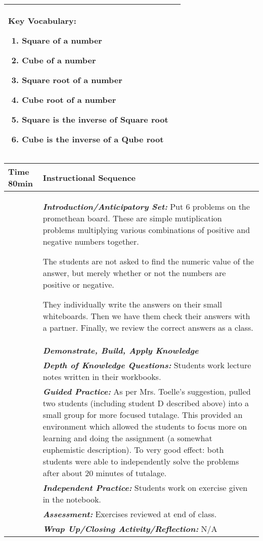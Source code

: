 \begin{tabularx}{\textwidth}{|X|X|}
               \textbf{Key Vocabulary:} 
                      {\begin{enumerate}
                        \item Square of a number
                        \item Cube of a number
                        \item Square root of a number
                        \item Cube root of a number
                        \item Square is the inverse of Square root
                        \item Cube is the inverse of a Qube root
                      \end{enumerate}} \\
                      \hline
\end{tabularx}

\pagebreak

\begin{tabularx}{\textwidth}{|p{0.5in}|X|}
  \hline
  \centerline{\textbf{\large Time} 80min} &  \textbf{\large Instructional Sequence } \\
  \hline
  
  \textbf{} & \textbf{\em Introduction/Anticipatory Set:} Put 6
  problems on the promethean board.  These are simple mutiplication
  problems multiplying various combinations of positive and negative
  numbers together.

  The students are not asked to find the numeric value of the answer,
  but merely whether or not the numbers are positive or negative.
  
  They individually write the answers on their small whiteboards.
  Then we have them check their answers with a partner.  Finally, we
  review the correct answers as a class. \\
  
  \hline
  \textbf{} &  \textbf{\em Demonstrate, Build, Apply Knowledge}   \\
  \hline
  \textbf{} &  \textbf{\em Depth of Knowledge Questions:} Students work lecture notes written in their workbooks.\\
  \hline
  \textbf{} &  \textbf{\em Guided Practice:} As per Mrs. Toelle's suggestion, pulled two students (including student D described above) into a small group for more focused tutalage.  This provided an environment which allowed the students to focus more on learning and doing the assignment (a somewhat euphemistic description).   To very good effect: both students were able to independently solve the problems after about 20 minutes of tutalage.  \\
  \hline
  \textbf{} &  \textbf{\em Independent Practice:} Students work on exercise given in the notebook. \\
  \hline
  \textbf{} &  \textbf{\em Assessment:} Exercises reviewed at end of class. \\
  \hline
  \textbf{} &  \textbf{\em Wrap Up/Closing Activity/Reflection:} N/A  \\
  \hline
\end{tabularx}

